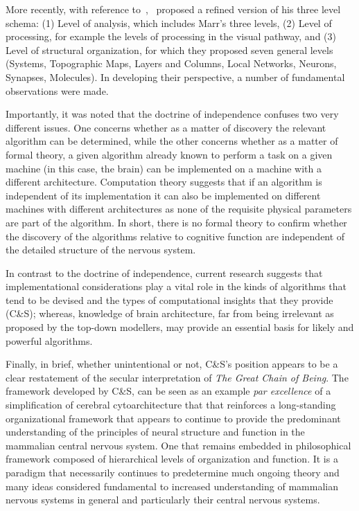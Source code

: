 \documentclass[11pt,3p,twocolumn]{JMN}
\begin{document}
More recently, with reference to~\citet{Marr:1982fk},~\citet[][C\&S]{Churchland:1992uq} proposed a refined version of his three level schema: (1) Level of analysis, which includes Marr’s three levels, (2) Level of processing, for example the levels of processing in the visual pathway, and (3) Level of structural organization, for which they proposed seven general levels (Systems, Topographic Maps, Layers and Columns, Local Networks, Neurons, Synapses, Molecules). In developing their perspective, a number of fundamental observations were made.

Importantly, it was noted that the doctrine of independence confuses two very different issues. One concerns whether as a matter of discovery the relevant algorithm can be determined, while the other concerns whether as a matter of formal theory, a given algorithm already known to perform a task on a given machine (in this case, the brain) can be implemented on a machine with a different architecture. Computation theory suggests that if an algorithm is independent of its implementation it can also be implemented on different machines with different architectures as none of the requisite physical parameters are part of the algorithm. In short, there is no formal theory to confirm whether the discovery of the algorithms relative to cognitive function are independent of the detailed structure of the nervous system.

In contrast to the doctrine of independence, current research suggests that implementational considerations play a vital role in the kinds of algorithms that tend to be devised and the types of computational insights that they provide (C\&S); whereas, knowledge of brain architecture, far from being irrelevant as proposed by the top-down modellers, may provide an essential basis for likely and powerful algorithms.

Finally, in brief, whether unintentional or not, C\&S's position appears to be a clear restatement of the secular interpretation of {\it{The Great Chain of Being}}. The framework developed by C\&S, can be seen as an example {\it{par excellence}} of a simplification of cerebral cytoarchitecture that that reinforces a long-standing organizational framework that appears to continue to provide the predominant understanding of the principles of neural structure and function in the mammalian central nervous system. One that remains embedded in philosophical framework composed of hierarchical levels of organization and function. It is a paradigm that necessarily continues to predetermine much ongoing theory and many ideas considered fundamental to increased understanding of mammalian nervous systems in general and particularly their central nervous systems.
\end{document}
